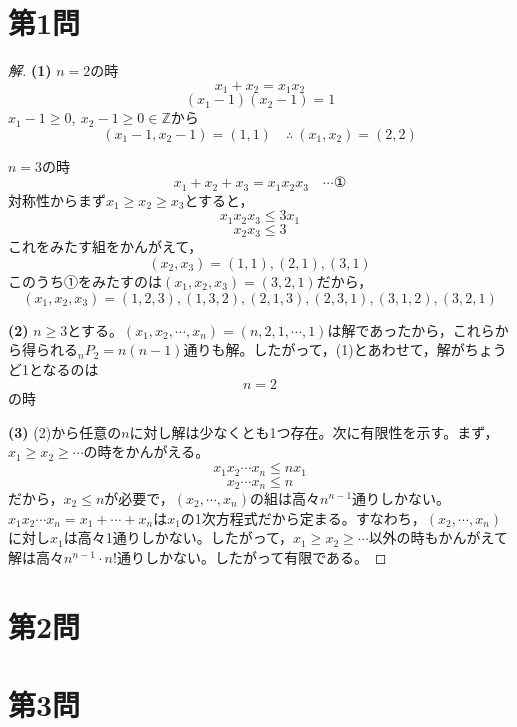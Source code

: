 \documentclass[../main.tex]{subfiles}
\begin{document}
\section*{第1問}

\begin{proof}[解]
  \textbf{(1)} $n=2$の時
  \[
    x_1+x_2=x_1x_2
  \]
  \[
    (x_1-1)(x_2-1)=1
  \]
  $x_1-1\ge0,\ x_2-1\ge0\in\mathbb{Z}$から
  \[
    (x_1-1,x_2-1)=(1,1) \quad\therefore\ (x_1,x_2)=(2,2)
  \]

  $n=3$の時
  \[
    x_1+x_2+x_3=x_1x_2x_3 \quad\cdots\text{①}
  \]
  対称性からまず$x_1\ge x_2\ge x_3$とすると，
  \[
    x_1x_2x_3\le3x_1
  \]
  \[
    x_2x_3\le3
  \]
  これをみたす組をかんがえて，
  \[
    (x_2,x_3)=(1,1),(2,1),(3,1)
  \]
  このうち①をみたすのは$(x_1,x_2,x_3)=(3,2,1)$だから，
  \[
    (x_1,x_2,x_3)=(1,2,3),(1,3,2),(2,1,3),(2,3,1),(3,1,2),(3,2,1)
  \]

  \textbf{(2)} $n\ge3$とする。$(x_1,x_2,\cdots,x_n)=(n,2,1,\cdots,1)$は解であったから，これらから得られる${}_nP_2=n(n-1)$通りも解。したがって，(1)とあわせて，解がちょうど1となるのは
  \[
    n=2
  \]
  の時

  \textbf{(3)} (2)から任意の$n$に対し解は少なくとも1つ存在。次に有限性を示す。まず，$x_1\ge x_2\ge\cdots$の時をかんがえる。
  \[
    x_1x_2\cdots x_n\le nx_1
  \]
  \[
    x_2\cdots x_n\le n
  \]
  だから，$x_2\le n$が必要で，$(x_2,\cdots,x_n)$の組は高々$n^{n-1}$通りしかない。$x_1x_2\cdots x_n=x_1+\cdots+x_n$は$x_1$の1次方程式だから定まる。すなわち，$(x_2,\cdots,x_n)$に対し$x_1$は高々1通りしかない。したがって，$x_1\ge x_2\ge\cdots$以外の時もかんがえて解は高々$n^{n-1}\cdot n!$通りしかない。したがって有限である。
\end{proof}

\newpage

\section*{第2問}


\newpage

\section*{第3問}
\end{document}

